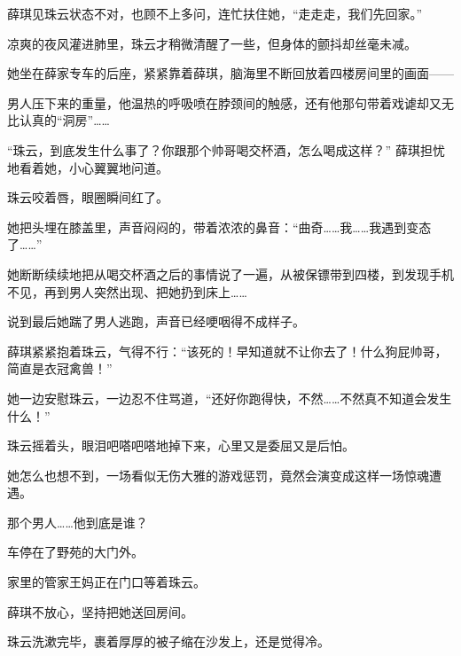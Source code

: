 \documentclass[12pt,a4paper]{article}
\begin{document}
薛琪见珠云状态不对，也顾不上多问，连忙扶住她，“走走走，我们先回家。”



凉爽的夜风灌进肺里，珠云才稍微清醒了一些，但身体的颤抖却丝毫未减。



她坐在薛家专车的后座，紧紧靠着薛琪，脑海里不断回放着四楼房间里的画面——



男人压下来的重量，他温热的呼吸喷在脖颈间的触感，还有他那句带着戏谑却又无比认真的“洞房”……



“珠云，到底发生什么事了？你跟那个帅哥喝交杯酒，怎么喝成这样？” 薛琪担忧地看着她，小心翼翼地问道。



珠云咬着唇，眼圈瞬间红了。



她把头埋在膝盖里，声音闷闷的，带着浓浓的鼻音：“曲奇……我……我遇到变态了……”



她断断续续地把从喝交杯酒之后的事情说了一遍，从被保镖带到四楼，到发现手机不见，再到男人突然出现、把她扔到床上……



说到最后她踹了男人逃跑，声音已经哽咽得不成样子。



薛琪紧紧抱着珠云，气得不行：“该死的！早知道就不让你去了！什么狗屁帅哥，简直是衣冠禽兽！”



她一边安慰珠云，一边忍不住骂道，“还好你跑得快，不然……不然真不知道会发生什么！”



珠云摇着头，眼泪吧嗒吧嗒地掉下来，心里又是委屈又是后怕。



她怎么也想不到，一场看似无伤大雅的游戏惩罚，竟然会演变成这样一场惊魂遭遇。



那个男人……他到底是谁？



车停在了野苑的大门外。



家里的管家王妈正在门口等着珠云。



薛琪不放心，坚持把她送回房间。



珠云洗漱完毕，裹着厚厚的被子缩在沙发上，还是觉得冷。
\end{document}
